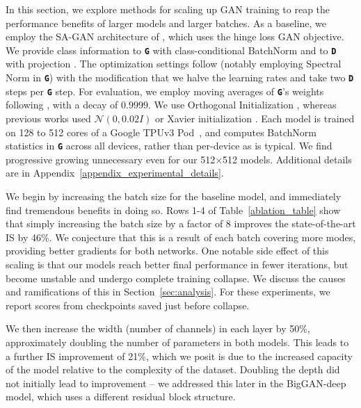 \documentclass{article} %
\newcommand{\gen}{\textbf{\texttt{G}}}
\newcommand{\discr}{\textbf{\texttt{D}}}
\begin{document}
In this section, we explore methods for scaling up GAN training to reap the performance benefits of larger models and larger batches. As a baseline, we employ the SA-GAN architecture of \citet{zhang2018sagan}, which uses the hinge loss \citep{lim2017geometric, tran2017hierarchical} GAN objective. We provide class information to \gen{} with class-conditional BatchNorm \citep{dumoulin2017artistic, devries2017modulating} and to \discr{} with projection \citep{miyato2018cgans}. The optimization settings follow \citet{zhang2018sagan} (notably employing Spectral Norm in \gen{}) with the modification that we halve the learning rates and take two \discr{} steps per \gen{} step.  For evaluation, we employ moving averages of \gen{}'s weights following \citet{karras2018progan, mescheder2018r1gp, yazici2018ema}, with a decay of $0.9999$. We use Orthogonal Initialization \citep{saxe2014ortho}, whereas previous works used $\mathcal{N}(0,0.02I)$ \citep{radford2016dcgan} or Xavier initialization \citep{glorot2010init}. Each model is trained on 128 to 512 cores of a Google TPUv3
Pod~\citep{tpu}, and computes BatchNorm statistics in \gen{} across all devices, rather than per-device as is typical. We find progressive growing \citep{karras2018progan} unnecessary even for our 512$\times$512 models. Additional details are in Appendix~\ref{appendix_experimental_details}.

We begin by increasing the batch size for the baseline model, and immediately find tremendous benefits in doing so. Rows 1-4 of Table~\ref{ablation_table} show that simply increasing the batch size by a factor of 8 improves the state-of-the-art IS by 46\%. We conjecture that this is a result of each batch covering more modes, providing better gradients for both networks. One notable side effect of this scaling is that our models reach better final performance in fewer iterations, but become unstable and undergo complete training collapse. We discuss the causes and ramifications of this in Section~\ref{sec:analysis}. For these experiments, we report scores from checkpoints saved just before collapse.

We then increase the width (number of channels) in each layer by 50\%, approximately doubling the number of parameters in both models. This leads to a further IS improvement of 21\%, which we posit is due to the increased capacity of the model relative to the complexity of the dataset. 
Doubling the depth did not initially lead to improvement -- we addressed this later in the BigGAN-deep model, which uses a different residual block structure.
\end{document}
